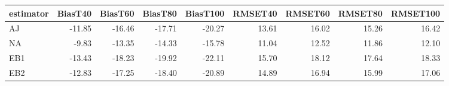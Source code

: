 \begin{table}[ht]
\centering
\begin{tabular}{lrrrrrrrr}
  \toprule
estimator & BiasT40 & BiasT60 & BiasT80 & BiasT100 & RMSET40 & RMSET60 & RMSET80 & RMSET100 \\ 
  \midrule
AJ & -11.85 & -16.46 & -17.71 & -20.27 & 13.61 & 16.02 & 15.26 & 16.42 \\ 
  NA & -9.83 & -13.35 & -14.33 & -15.78 & 11.04 & 12.52 & 11.86 & 12.10 \\ 
  EB1 & -13.43 & -18.23 & -19.92 & -22.11 & 15.70 & 18.12 & 17.64 & 18.33 \\ 
  EB2 & -12.83 & -17.25 & -18.40 & -20.89 & 14.89 & 16.94 & 15.99 & 17.06 \\ 
   \bottomrule
\end{tabular}
\end{table}
